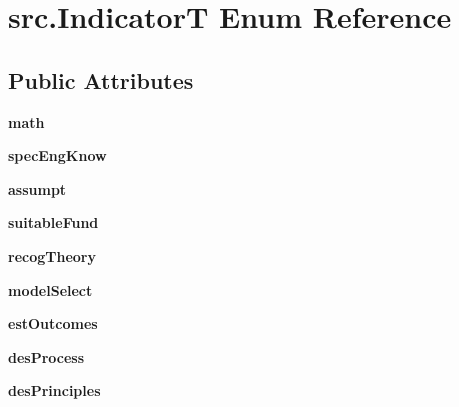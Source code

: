 \hypertarget{enumsrc_1_1IndicatorT}{}\section{src.\+IndicatorT Enum Reference}
\label{enumsrc_1_1IndicatorT}
\subsection*{Public Attributes}
\begin{DoxyCompactItemize}
\item 
\mbox{\label{enumsrc_1_1IndicatorT_a0dac6dc84d4a1293fd4e9503c6c2a4a6}} 
{\bfseries math}
\item 
\mbox{\label{enumsrc_1_1IndicatorT_ab681ce9d18fbc1c656aa271f133c8d14}} 
{\bfseries spec\+Eng\+Know}
\item 
\mbox{\label{enumsrc_1_1IndicatorT_affeeb33716c274a15e9831b67ec84025}} 
{\bfseries assumpt}
\item 
\mbox{\label{enumsrc_1_1IndicatorT_affa800d8cd6e334fc4b78e75f8502b17}} 
{\bfseries suitable\+Fund}
\item 
\mbox{\label{enumsrc_1_1IndicatorT_aff7a1f22a0b703a9b9625a230091f294}} 
{\bfseries recog\+Theory}
\item 
\mbox{\label{enumsrc_1_1IndicatorT_abe0f9ac166df39f0372807d93791eb71}} 
{\bfseries model\+Select}
\item 
\mbox{\label{enumsrc_1_1IndicatorT_af68e57c36ef486c6931036879cd69446}} 
{\bfseries est\+Outcomes}
\item 
\mbox{\label{enumsrc_1_1IndicatorT_a352f9f49260ede865b82b1118c6bf4e7}} 
{\bfseries des\+Process}
\item 
\mbox{\label{enumsrc_1_1IndicatorT_a951f3d3d8d9adf7cf89f5e584ae6adfd}} 
{\bfseries des\+Principles}
\item 
\mbox{\label{enumsrc_1_1IndicatorT_ae3cf505a25a85f6911a3356bc4e0094d}} 

\end{DoxyCompactItemize}
